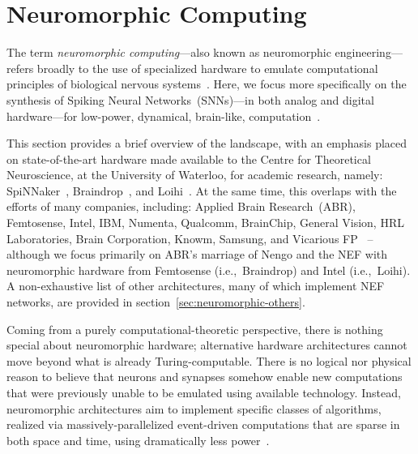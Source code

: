 \section{Neuromorphic Computing}
\label{sec:neuromorphic}

The term \emph{neuromorphic computing}---also known as neuromorphic engineering---refers broadly to the use of specialized hardware to emulate computational principles of biological nervous systems~\citep{mead1989analog, liu2002analog}.
Here, we focus more specifically on the synthesis of Spiking Neural Networks~(SNNs)---in both analog and digital hardware---for low-power, dynamical, brain-like, computation~\citep{boahen2017neuromorph}.

This section provides a brief overview of the landscape, with an emphasis placed on state-of-the-art hardware made available to the Centre for Theoretical Neuroscience, at the University of Waterloo, for academic research, namely: SpiNNaker~\citep{furber2014spinnaker}, Braindrop~\citep{braindrop2019}, and Loihi~\citep{davies2018loihi}.
At the same time, this overlaps with the efforts of many companies, including: Applied Brain Research~(ABR), Femtosense, Intel, IBM, Numenta, Qualcomm, BrainChip, General Vision, HRL Laboratories, Brain Corporation, Knowm, Samsung, and Vicarious FP~\citep{marketreport2018, femtosense} -- although we focus primarily on ABR's marriage of Nengo and the NEF with neuromorphic hardware from Femtosense (i.e.,~Braindrop) and Intel (i.e.,~Loihi).
A non-exhaustive list of other architectures, many of which implement NEF networks, are provided in section~\ref{sec:neuromorphic-others}.

Coming from a purely computational-theoretic perspective, there is nothing special about neuromorphic hardware; alternative hardware architectures cannot move beyond what is already Turing-computable.
There is no logical nor physical reason to believe that neurons and synapses somehow enable new computations that were previously unable to be emulated using available technology.
Instead, neuromorphic architectures aim to implement specific classes of algorithms, realized via massively-parallelized event-driven computations that are sparse in both space and time, using dramatically less power~\citep{tang2017sparse}.

